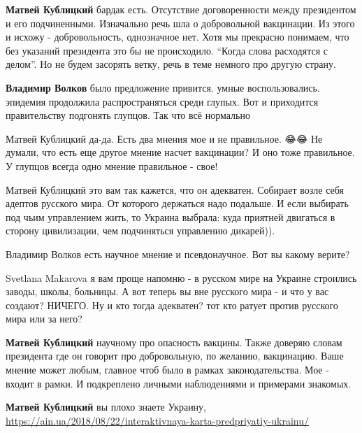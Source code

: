 \begin{itemize}
\begin{itemize}

\textbf{Матвей Кублицкий} бардак есть. Отсутствие договоренности между президентом и его
подчиненными. Изначально речь шла о добровольной вакцинации. Из этого и исхожу
- добровольность, однозначное нет.  Хотя мы прекрасно понимаем, что без
указаний президента это бы не происходило. \enquote{Когда слова расходятся с делом}.
Но не будем засорять ветку, речь в теме немного про другую страну.


\textbf{Владимир Волков} было предложение привится. умные воспользовались. эпидемия
продолжила распространяться среди глупых. Вот и приходится правительству
подгонять глупцов. Так что всё нормально


Матвей Кублицкий да-да. Есть два мнения мое и не правильное. 😂😂 Не думали,
что есть еще другое мнение насчет вакцинации? И оно тоже правильное. У глупцов
всегда одно мнение правильное - свое!


Матвей Кублицкий это вам так кажется, что он адекватен. Собирает возле себя
адептов русского мира. От которого держаться надо подальше. И если выбирать под
чьим управлением жить, то Украина выбрала: куда приятней двигаться в сторону
цивилизации, чем подчиняться управлению дикарей)).


Владимир Волков есть научное мнение и псевдонаучное. Вот вы какому верите?


Svetlana Makarova я вам проще напомню - в русском мире на Украине строились
заводы, школы, больницы. А вот теперь вы вне русского мира - и что у вас
создают? НИЧЕГО. Ну и кто тогда адекватен? тот кто ратует против русского мира
или за него?


\textbf{Матвей Кублицкий} научному про опасность вакцины.  Также доверяю словам
президента где он говорит про добровольную, по желанию, вакцинацию.  Ваше
мнение может любым, главное чтоб было в рамках законодательства. Мое - входит в
рамки. И подкреплено личными наблюдениями и примерами знакомых.

\textbf{Матвей Кублицкий} вы плохо знаете Украину,
\url{https://ain.ua/2018/08/22/interaktivnaya-karta-predpriyatiy-ukrainu/}

\end{itemize}

\end{itemize}
